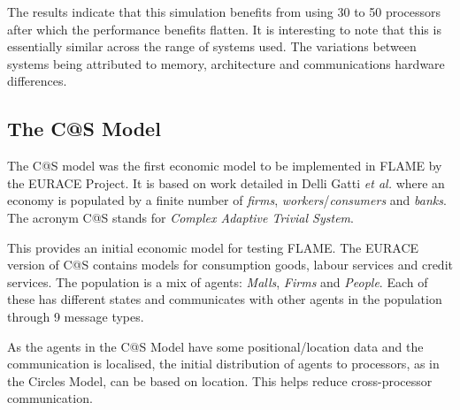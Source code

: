 The results indicate that this simulation benefits from using 30 to 50 processors after which the performance benefits flatten. It is interesting to note that this is essentially similar across the range of systems used. The variations between systems being attributed to memory, architecture and communications hardware differences.

\subsection{The C@S Model}
The C@S model was the first economic model to be implemented in FLAME by the EURACE Project.  It is based on work detailed in Delli Gatti \textsl{et al.} \cite{Delli Gatti} where an economy is populated by a finite number of \textsl{firms}, \textsl{workers}/\textsl{consumers} and \textsl{banks}. The acronym C@S stands for \textsl{Complex Adaptive Trivial System}.

This provides an initial economic model for testing FLAME. The EURACE version of C@S contains models for consumption goods, labour services and credit services. The population is a mix of agents: \textsl{Malls}, \textsl{Firms} and \textsl{People}. Each of these has different states and communicates with other agents in the population through 9 message types.

As the agents in the C@S Model have some positional/location data and the communication is localised, the initial distribution of agents to processors, as in the Circles Model, can be based on location. This helps reduce cross-processor communication.

